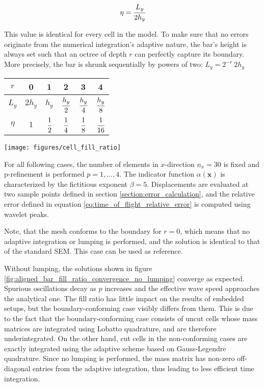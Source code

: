 \begin{equation} \label{eq:fill_ratio}
	\eta = \cfrac{L_y}{2h_y}
\end{equation}

This value is identical for every cell in the model. To make sure that no errors originate from the numerical integration's adaptive nature, the bar's height is always set such that an octree of depth $r$ can perfectly capture its boundary. More precisely, the bar is shrunk sequentially by powers of two: $L_y = 2 ^{-r} \ 2h_y$

\begin{center}
\begin{minipage}[b]{0.45\textwidth}
	\centering
	\bgroup
		\def\arraystretch{2.5}
		\begin{tabular}{|c||c|c|c|c|c|}
			\hline
			$r$ & 0 & 1 & 2 & 3 & 4 \\
			\hline
			$L_y$ & $2h_y$ & $h_y$ & $\cfrac{h_y}{2}$ & $\cfrac{h_y}{4}$ & $\cfrac{h_y}{8}$ \\ 
			\hline
			$\eta$ & $1$ & $\cfrac{1}{2}$ & $\cfrac{1}{4}$ & $\cfrac{1}{8}$ & $\cfrac{1}{16}$ \\
			\hline
		\end{tabular}
	\egroup
\end{minipage}
\hfill
\begin{minipage}[b]{0.45\textwidth}
	\centering
	\texttt{[image: figures/cell\_fill\_ratio]}
\end{minipage}
\end{center}

For all following cases, the number of elements in $x$-direction $n_x=30$ is fixed and p-refinement is performed $p=1,...,4$. The indicator function $\alpha(\mathbf x)$ is characterized by the fictitious exponent $\beta = 5$. Displacements are evaluated at two sample points defined in section \ref{section:error_calculation}, and the relative error defined in equation \ref{eq:time_of_flight_relative_error} is computed using wavelet peaks.

Note, that the mesh conforms to the boundary for $r=0$, which means that no adaptive integration or lumping is performed, and the solution is identical to that of the standard SEM. This case can be used as reference.

Without lumping, the solutions shown in figure \ref{fig:aligned_bar_fill_ratio_convergence_no_lumping} converge as expected. Spurious oscillations decay as $p$ increases and the effective wave speed approaches the analytical one. The fill ratio has little impact on the results of embedded setups, but the boundary-conforming case visibly differs from them. This is due to the fact that the boundary-conforming case consists of uncut cells whose mass matrices are integrated using Lobatto quadrature, and are therefore underintegrated. On the other hand, cut cells in the non-conforming cases are exactly integrated using the adaptive scheme based on Gauss-Legendre quadrature.
Since no lumping is performed, the mass matrix has non-zero off-diagonal entries from the adaptive integration, thus leading to less efficient time integration.


